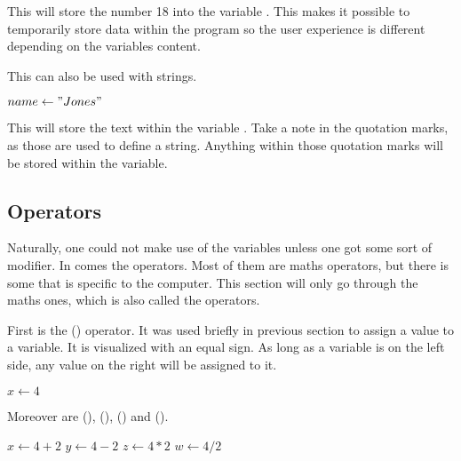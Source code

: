 This will store the number 18 into the variable . This makes it possible to temporarily store data within the program so the user experience is different depending on the variables content.

This can also be used with strings.

\begin{algorithm}[H]
	\begin{algorithmic}[1]
		\State $name \gets "Jones"$
	\end{algorithmic}
\end{algorithm}

This will store the text  within the variable . Take a note in the quotation marks, as those are used to define a string. Anything within those quotation marks will be stored within the variable.

\subsection{Operators}

Naturally, one could not make use of the variables unless one got some sort of modifier. In comes the operators. Most of them are maths operators, but there is some that is specific to the computer. This section will only go through the maths ones, which is also called the  operators.

First is the  (\code{=}) operator. It was used briefly in previous section to assign a value to a variable. It is visualized with an equal sign. As long as a variable is on the left side, any value on the right will be assigned to it.

\begin{algorithm}[H]
	\begin{algorithmic}[1]
		\State $x \gets 4$
	\end{algorithmic}
\end{algorithm}

Moreover are  (\code{+}),  (\code{-}),  (\code{*}) and  (\code{/}).

\begin{algorithm}[H]
	\begin{algorithmic}[1]
		\State $x \gets 4 + 2$
		\State $y \gets 4 - 2$
		\State $z \gets 4 * 2$
		\State $w \gets 4 / 2$
	\end{algorithmic}
\end{algorithm}

